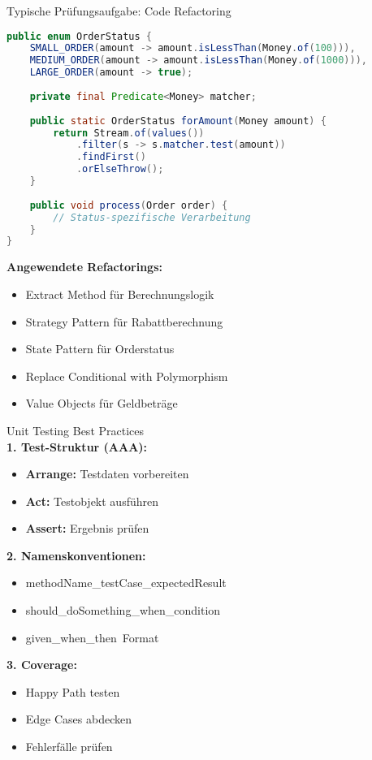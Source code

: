 \begin{example2}{Typische Prüfungsaufgabe: Code Refactoring}
\begin{lstlisting}[language=Java, style=base]
public enum OrderStatus {
    SMALL_ORDER(amount -> amount.isLessThan(Money.of(100))),
    MEDIUM_ORDER(amount -> amount.isLessThan(Money.of(1000))),
    LARGE_ORDER(amount -> true);
    
    private final Predicate<Money> matcher;
    
    public static OrderStatus forAmount(Money amount) {
        return Stream.of(values())
            .filter(s -> s.matcher.test(amount))
            .findFirst()
            .orElseThrow();
    }
    
    public void process(Order order) {
        // Status-spezifische Verarbeitung
    }
}
\end{lstlisting}

\textbf{Angewendete Refactorings:}
\begin{itemize}
    \item Extract Method für Berechnungslogik
    \item Strategy Pattern für Rabattberechnung
    \item State Pattern für Orderstatus
    \item Replace Conditional with Polymorphism
    \item Value Objects für Geldbeträge
\end{itemize}
\end{example2}

\begin{KR}{Unit Testing Best Practices}\\
\textbf{1. Test-Struktur (AAA):}
\begin{itemize}
    \item \textbf{Arrange:} Testdaten vorbereiten
    \item \textbf{Act:} Testobjekt ausführen
    \item \textbf{Assert:} Ergebnis prüfen
\end{itemize}

\textbf{2. Namenskonventionen:}
\begin{itemize}
    \item methodName\_testCase\_expectedResult
    \item should\_doSomething\_when\_condition
    \item given\_when\_then\ Format
\end{itemize}

\textbf{3. Coverage:}
\begin{itemize}
    \item Happy Path testen
    \item Edge Cases abdecken
    \item Fehlerfälle prüfen
\end{itemize}
\end{KR}

